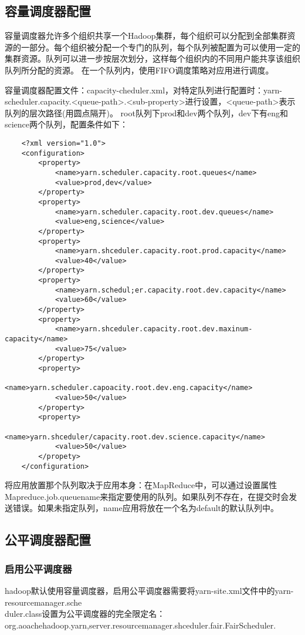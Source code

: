 \documentclass[a4paper]{article}
\begin{document}
	
	\subsection{容量调度器配置}
	容量调度器允许多个组织共享一个Hadoop集群，每个组织可以分配到全部集群资源的一部分。每个组织被分配一个专门的队列，每个队列被配置为可以使用一定的集群资源。队列可以进一步按层次划分，这样每个组织内的不同用户能共享该组织队列所分配的资源。 在一个队列内，使用FIFO调度策略对应用进行调度。
	
	容量调度器配置文件：capacity-cheduler.xml，对特定队列进行配置时：yarn-scheduler.capacity.<queue-path>.<sub-property>进行设置，<queue-path>表示队列的层次路径(用圆点隔开)。
	root队列下prod和dev两个队列，dev下有eng和science两个队列，配置条件如下：
	\begin{lstlisting}
	<?xml version="1.0">
	<configuration>
		<property>
			<name>yarn.scheduler.capacity.root.queues</name>
			<value>prod,dev</value>
		</property>
		<property>
			<name>yarn.scheduler.capacity.root.dev.queues</name>
			<value>eng,science</value>
		</property>
		<property>
			<name>yarn.shceduler.capacity.root.prod.capacity</name>
			<value>40</value>
		</property>
		<property>
			<name>yarn.schedul;er.capacity.root.dev.capacity</name>
			<value>60</value>
		</property>
		<property>
			<name>yarn.shceduler.capacity.root.dev.maxinum-capacity</name>
			<value>75</value>
		</property>
		<property>
			<name>yarn.scheduler.capoacity.root.dev.eng.capacity</name>
			<value>50</value>
		</property>
		<property>
			<name>yarn.shceduler/capacity.root.dev.science.capacity</name>
			<value>50</value>
		</propety>
	</configuration>
	\end{lstlisting}
	
	将应用放置那个队列取决于应用本身：在MapReduce中，可以通过设置属性Mapreduce.job.queuename来指定要使用的队列。如果队列不存在，在提交时会发送错误。如果未指定队列，name应用将放在一个名为default的默认队列中。
	
	\subsection{公平调度器配置}
	\subsubsection{启用公平调度器}
	hadoop默认使用容量调度器，启用公平调度器需要将yarn-site.xml文件中的yarn-resourcemanager.sche\\duler.class设置为公平调度器的完全限定名：org.aoachehadoop.yarn,server.resourcemanager.shceduler.fair.FairScheduler.
	
\end{document}

